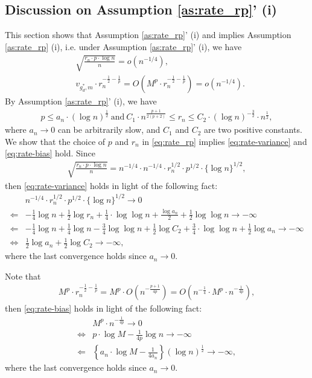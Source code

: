 \documentclass[11pt]{article}
\numberwithin{equation}{section}
\begin{document}
{
	\subsection{Discussion on Assumption \ref{as:rate_rp}' (i)}
	This section shows that Assumption \ref{as:rate_rp}' (i) and implies Assumption \ref{as:rate_rp} (i), i.e. under Assumption \ref{as:rate_rp}' (i), we have
	\begin{align}\label{eq:rate-variance}
		&\sqrt{\frac{ r_n\cdot p\cdot \log n}{n}}=o\left(n^{-1/4}\right),\\
		&v_{g_d^*,m}\cdot r_n^{-\frac{1}{2}-\frac{1}{p}}=O\left( M^p\cdot r_n^{-\frac{1}{2}-\frac{1}{p}}\right)=o\left(n^{-1/4}\right). \label{eq:rate-bias}
	\end{align}
	By Assumption \ref{as:rate_rp}' (i), we have
	\begin{align}\label{eq:rate_rp}
		p\leq a_n\cdot\left(\log n\right)^{\frac{1}{2}}\ \text{and} \  C_1\cdot n^{\frac{p+1}{2(p+2)}}\leq r_n \leq C_2\cdot  (\log n)^{-\frac{3}{2}}\cdot n^{\frac{1}{2}},
	\end{align}
	where $a_n\to 0$ can be arbitrarily slow, and $C_1$ and $C_2$ are two positive constants. We show that the choice of $p$ and $r_n$ in \eqref{eq:rate_rp} implies \eqref{eq:rate-variance} and \eqref{eq:rate-bias} hold. Since
	\begin{align*}
		\sqrt{\frac{r_n\cdot p\cdot \log n}{n}}=n^{-1/4}\cdot n^{-1/4}\cdot r_n^{1/2}\cdot p^{1/2}\cdot \{\log n\}^{1/2},
	\end{align*}
	then  \eqref{eq:rate-variance} holds in light of the following fact:
	\begin{align*}
		& n^{-1/4}\cdot r_{n}^{1/2}\cdot p^{1/2}\cdot \{\log n\}^{1/2}\rightarrow 0\\
		\Leftarrow & -\frac{1}{4}\log n+\frac{1}{2}\log r_{n}+\frac{1}{4}\cdot \log\log n+\frac{\log a_{n}}{2}+\frac{1}{2}\log \log n\rightarrow -\infty  \\
		\Leftarrow & -\frac{1}{4}\log n+\frac{1}{4}\log n-\frac{3}{4}\log \log n+\frac{1}{2}\log C_2+\frac{3}{4}\cdot \log \log n+\frac{1}{2}\log a_{n}\rightarrow -\infty  \\
		\Leftrightarrow & \frac{1}{2}\log a_{n}+\frac{1}{2}\log C_2\rightarrow -\infty ,
	\end{align*}%
	where the last convergence holds since $a_{n}\rightarrow 0$.
	
	
	
	Note that
	\begin{align*}
		M^p\cdot r_n^{-\frac{1}{2}-\frac{1}{p}}= M^p\cdot O\left(n^{-\frac{p+1}{4p}}\right)=O\left(n^{-\frac{1}{4}}\cdot  M^p\cdot n^{-\frac{1}{4p}}\right),
	\end{align*}
	then \eqref{eq:rate-bias} holds in light of the following fact:
	\begin{align*}
		& M^p\cdot n^{-\frac{1}{4p}}\to 0\\
		\Leftrightarrow&p\cdot \log M-\frac{1}{4p}\log n\to -\infty\\
		\Leftarrow&\left\{a_n\cdot \log M-\frac{1}{4a_n}\right\}\left(\log n\right)^{\frac{1}{2}}\to -\infty,
	\end{align*}
	where the last convergence holds since $a_n\to 0$.
	
}
\end{document}
